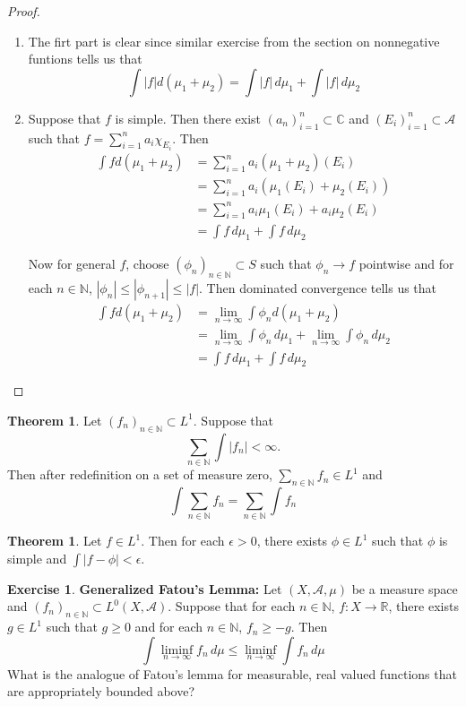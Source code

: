 \documentclass[12pt]{amsart}
\theoremstyle{definition}
\newtheorem{thm}[definition]{Theorem}
\newtheorem{ex}[definition]{Exercise}
\newcommand{\ep}{\epsilon}
\newcommand{\C}{\mathbb{C}}
\newcommand{\N}{\mathbb{N}}
\newcommand{\R}{\mathbb{R}}
\newcommand{\MA}{\mathcal{A}}
\newcommand{\dmu}{\, d \mu}
\newcommand{\limfn}{\liminf \limits_{n \rightarrow \infty}}
\newcommand{\limn}{\lim \limits_{n \rightarrow \infty}}
\newcommand{\lex}[1]{\label{ex:#1}}
\begin{document}
	\begin{proof}
		\begin{enumerate}
			\item The firt part is clear since similar exercise from the section on nonnegative funtions tells us that $$\int |f| d(\mu_1 + \mu_2) = \int |f| \dmu_1 + \int |f| \dmu_2$$
			
			
			\item Suppose that $f$ is simple. Then there exist $(a_n)_{i=1}^n \subset \C$ and $(E_i)_{i=1}^n \subset \MA$ such that $f = \sum\limits_{i =1}^n a_i \chi_{E_i}$. Then 
			\begin{align*}
				\int f d(\mu_1 + \mu_2) 
				&= \sum\limits_{i =1}^n a_i (\mu_1 + \mu_2)(E_i)\\
				&= \sum\limits_{i =1}^n a_i (\mu_1(E_i) + \mu_2(E_i))\\
				&= \sum\limits_{i =1}^n a_i \mu_1(E_i) + a_i \mu_2(E_i)\\
				&= \int f \dmu_1 + \int f \dmu_2
			\end{align*}
			
			Now for general $f$, choose $(\phi_n)_{n \in \N} \subset S$ such that $\phi_n \rightarrow f$ pointwise and for each $n \in \N$, $|\phi_n| \leq |\phi_{n+1}| \leq |f|$. Then dominated convergence tells us that 
			\begin{align*}
				\int f d(\mu_1 + \mu_2) 
				&= \limn \int \phi_n d(\mu_1 + \mu_2)\\
				&= \limn \int \phi_n \dmu_1 + \limn \int \phi_n \dmu_2 \\
				&= \int f \dmu_1 + \int f \dmu_2
			\end{align*}
			
		\end{enumerate}
	\end{proof}
	
	\begin{thm}
		Let $(f_n)_{n \in \N} \subset L^1$. Suppose that $$\sum_{n \in \N} \int |f_n| < \infty.$$ Then after redefinition on a set of measure zero, $\sum_{n \in \N}f_n \in L^1$ and $$\int \sum_{n \in \N}f_n = \sum_{n \in \N} \int f_n$$
	\end{thm}
	
	\begin{thm}
		Let $f \in L^1$. Then for each $\ep > 0$, there exists $\phi \in L^1$ such that $\phi$ is simple and $\int |f - \phi| < \ep$. 
	\end{thm}
	
	\begin{ex} \lex{00000} \textbf{Generalized Fatou's Lemma:}
		Let $(X, \MA, \mu)$ be a measure space and $(f_n)_{n \in \N} \subset L^0(X, \MA)$. Suppose that for each $n \in \N$, $f:X \rightarrow \R$, there exists $g \in L^1$ such that $g \geq 0$ and for each $n \in \N$, $f_n \geq -g$. Then 
		$$ \int \limfn f_n \dmu \leq \limfn \int f_n \dmu $$ 
		What is the analogue of Fatou's lemma for measurable, real valued functions that are appropriately bounded above?  
	\end{ex}
	
\end{document}
